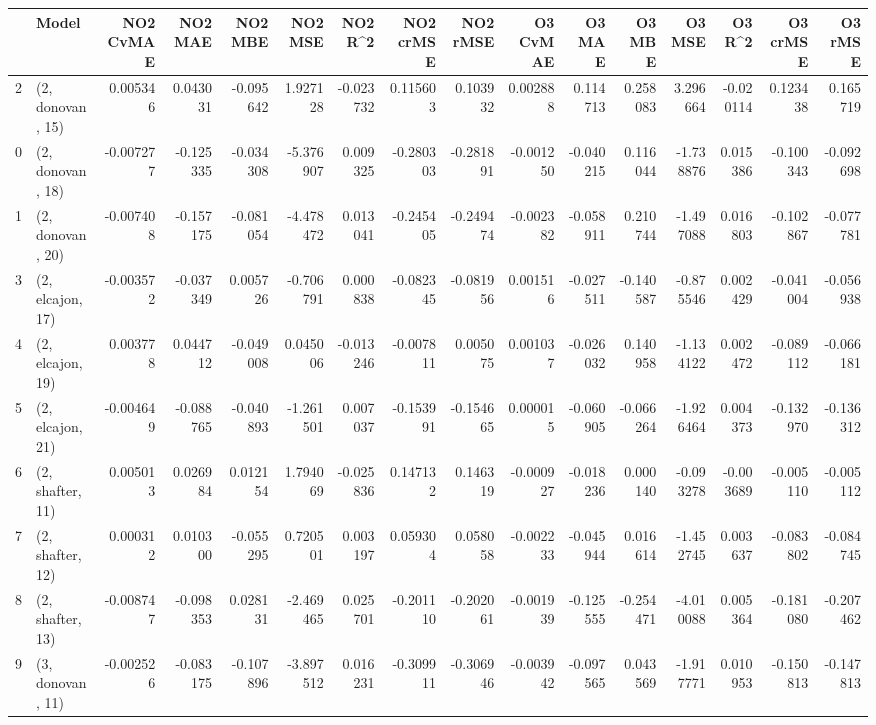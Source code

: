 \begin{tabular}{llrrrrrrrrrrrrrr}
\toprule
{} &             Model &  NO2 CvMAE &   NO2 MAE &   NO2 MBE &    NO2 MSE &   NO2 R\textasciicircum2 &  NO2 crMSE &  NO2 rMSE &  O3 CvMAE &    O3 MAE &    O3 MBE &     O3 MSE &    O3 R\textasciicircum2 &  O3 crMSE &   O3 rMSE \\
\midrule
2  &  (2, donovan, 15) &   0.005346 &  0.043031 & -0.095642 &   1.927128 & -0.023732 &   0.115603 &  0.103932 &  0.002888 &  0.114713 &  0.258083 &   3.296664 & -0.020114 &  0.123438 &  0.165719 \\
0  &  (2, donovan, 18) &  -0.007277 & -0.125335 & -0.034308 &  -5.376907 &  0.009325 &  -0.280303 & -0.281891 & -0.001250 & -0.040215 &  0.116044 &  -1.738876 &  0.015386 & -0.100343 & -0.092698 \\
1  &  (2, donovan, 20) &  -0.007408 & -0.157175 & -0.081054 &  -4.478472 &  0.013041 &  -0.245405 & -0.249474 & -0.002382 & -0.058911 &  0.210744 &  -1.497088 &  0.016803 & -0.102867 & -0.077781 \\
3  &  (2, elcajon, 17) &  -0.003572 & -0.037349 &  0.005726 &  -0.706791 &  0.000838 &  -0.082345 & -0.081956 &  0.001516 & -0.027511 & -0.140587 &  -0.875546 &  0.002429 & -0.041004 & -0.056938 \\
4  &  (2, elcajon, 19) &   0.003778 &  0.044712 & -0.049008 &   0.045006 & -0.013246 &  -0.007811 &  0.005075 &  0.001037 & -0.026032 &  0.140958 &  -1.134122 &  0.002472 & -0.089112 & -0.066181 \\
5  &  (2, elcajon, 21) &  -0.004649 & -0.088765 & -0.040893 &  -1.261501 &  0.007037 &  -0.153991 & -0.154665 &  0.000015 & -0.060905 & -0.066264 &  -1.926464 &  0.004373 & -0.132970 & -0.136312 \\
6  &  (2, shafter, 11) &   0.005013 &  0.026984 &  0.012154 &   1.794069 & -0.025836 &   0.147132 &  0.146319 & -0.000927 & -0.018236 &  0.000140 &  -0.093278 & -0.003689 & -0.005110 & -0.005112 \\
7  &  (2, shafter, 12) &   0.000312 &  0.010300 & -0.055295 &   0.720501 &  0.003197 &   0.059304 &  0.058058 & -0.002233 & -0.045944 &  0.016614 &  -1.452745 &  0.003637 & -0.083802 & -0.084745 \\
8  &  (2, shafter, 13) &  -0.008747 & -0.098353 &  0.028131 &  -2.469465 &  0.025701 &  -0.201110 & -0.202061 & -0.001939 & -0.125555 & -0.254471 &  -4.010088 &  0.005364 & -0.181080 & -0.207462 \\
9  &  (3, donovan, 11) &  -0.002526 & -0.083175 & -0.107896 &  -3.897512 &  0.016231 &  -0.309911 & -0.306946 & -0.003942 & -0.097565 &  0.043569 &  -1.917771 &  0.010953 & -0.150813 & -0.147813 \\

\end{tabular}
